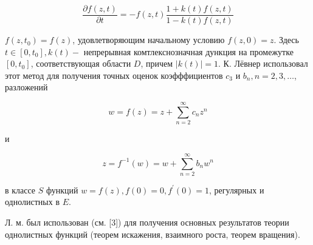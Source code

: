 \documentclass[10pt]{article}
\begin{document}
\[

\frac{\partial f(z, t)}{\partial t}=-f(z, t) \frac{1+k(t) f(z, t)}{1-k(t) f(z, t)}

\]



$f\left(z, t_{0}\right)=f(z)$, удовлетворяющим начальному условию $f(z, 0)=z$. Здесь $t \in\left[0, t_{0}\right], k(t)-$ непрерывная комтлекснозначная дункция на промежутке $\left[0, t_{0}\right]$, соответствующая области $D$, причем $|k(t)|=1$. К. Лёвнер использовал этот метод для получения точных оценок коэфффициентов $c_{3}$ и $b_{n}, n=2,3, \ldots$, разложений



\[

w=f(z)=z+\sum_{n=2}^{\infty} c_{n} z^{n}

\]



и



\[

z=f^{-1}(w)=w+\sum_{n=2}^{\infty} b_{n} w^{n}

\]



в классе $S$ функций $w=f(z), f(0)=0, f^{\prime}(0)=1$, регулярных и однолистных в $E$.



Л. м. был использован (см. [3]) для получения основных результатов теории однолистных функций (теорем искажения, взаимного роста, теорем вращения).
\end{document}
